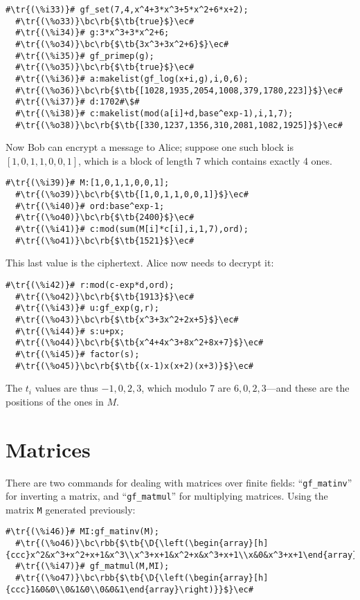 \documentclass[a4paper,11pt,leqno,fleqn]{artikel3}
\newcommand{\D}{\displaystyle}
\newcommand{\bc}{\begin{center}}
\newcommand{\ec}{\end{center}}
\newcommand{\tr}[1]{\textcolor{red}{#1}}
\newcommand{\tb}[1]{\textcolor{blue}{#1}}
\newcommand{\rb}[1]{\raisebox{2mm}[0mm][1mm]{#1}}
\newcommand{\rbb}[1]{\raisebox{-4mm}[0mm][9mm]{#1}}
\begin{document}
\begin{lstlisting}[escapechar=\#]
  #\tr{(\%i33)}# gf_set(7,4,x^4+3*x^3+5*x^2+6*x+2);
  #\tr{(\%o33)}\bc\rb{$\tb{true}$}\ec#
  #\tr{(\%i34)}# g:3*x^3+3*x^2+6;
  #\tr{(\%o34)}\bc\rb{$\tb{3x^3+3x^2+6}$}\ec#
  #\tr{(\%i35)}# gf_primep(g);
  #\tr{(\%o35)}\bc\rb{$\tb{true}$}\ec#
  #\tr{(\%i36)}# a:makelist(gf_log(x+i,g),i,0,6);
  #\tr{(\%o36)}\bc\rb{$\tb{[1028,1935,2054,1008,379,1780,223]}$}\ec#
  #\tr{(\%i37)}# d:1702#\$#
  #\tr{(\%i38)}# c:makelist(mod(a[i]+d,base^exp-1),i,1,7);
  #\tr{(\%o38)}\bc\rb{$\tb{[330,1237,1356,310,2081,1082,1925]}$}\ec#
\end{lstlisting}

Now Bob can encrypt a message to Alice; suppose one such block is
$[1,0,1,1,0,0,1]$, which is a block of length 7 which contains exactly 4 ones.

\begin{lstlisting}[escapechar=\#]
  #\tr{(\%i39)}# M:[1,0,1,1,0,0,1];
  #\tr{(\%o39)}\bc\rb{$\tb{[1,0,1,1,0,0,1]}$}\ec#
  #\tr{(\%i40)}# ord:base^exp-1;
  #\tr{(\%o40)}\bc\rb{$\tb{2400}$}\ec#
  #\tr{(\%i41)}# c:mod(sum(M[i]*c[i],i,1,7),ord);
  #\tr{(\%o41)}\bc\rb{$\tb{1521}$}\ec#
\end{lstlisting}

This last value is the ciphertext.  Alice now needs to decrypt it:

\begin{lstlisting}[escapechar=\#]
  #\tr{(\%i42)}# r:mod(c-exp*d,ord);
  #\tr{(\%o42)}\bc\rb{$\tb{1913}$}\ec#
  #\tr{(\%i43)}# u:gf_exp(g,r);
  #\tr{(\%o43)}\bc\rb{$\tb{x^3+3x^2+2x+5}$}\ec#
  #\tr{(\%i44)}# s:u+px;
  #\tr{(\%o44)}\bc\rb{$\tb{x^4+4x^3+8x^2+8x+7}$}\ec#
  #\tr{(\%i45)}# factor(s);
  #\tr{(\%o45)}\bc\rb{$\tb{(x-1)x(x+2)(x+3)}$}\ec#
\end{lstlisting}

The $t_i$ values are thus $-1,0,2,3$, which modulo 7 are $6,0,2,3$---and these
are the positions of the ones in $M$.

\section*{Matrices}

There are two commands for dealing with matrices over finite fields:
``\verb!gf_matinv!'' for inverting a matrix, and ``\verb!gf_matmul!'' for
multiplying matrices.  Using the matrix \texttt{M} generated previously:

\begin{lstlisting}[escapechar=\#]
  #\tr{(\%i46)}# MI:gf_matinv(M);
  #\tr{(\%o46)}\bc\rbb{$\tb{\D{\left(\begin{array}[h]{ccc}x^2&x^3+x^2+x+1&x^3\\x^3+x+1&x^2+x&x^3+x+1\\x&0&x^3+x+1\end{array}\right)}}$}\ec#
  #\tr{(\%i47)}# gf_matmul(M,MI);
  #\tr{(\%o47)}\bc\rbb{$\tb{\D{\left(\begin{array}[h]{ccc}1&0&0\\0&1&0\\0&0&1\end{array}\right)}}$}\ec#
\end{lstlisting}
\end{document}
